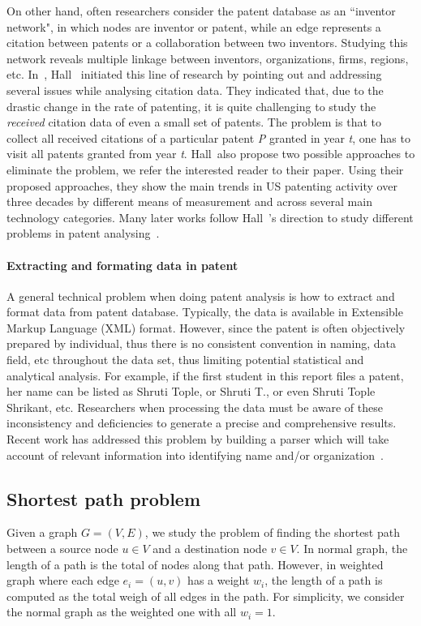 On other hand, often researchers consider the patent database as
an ``inventor network", in which nodes are inventor or patent, while an edge
represents a citation between patents or a collaboration between two inventors.
Studying this network reveals multiple linkage between inventors,
organizations, firms, regions, etc. In~\cite{Hall01thenber}, Hall~\etal
initiated this line of research by pointing out and addressing several issues
while analysing citation data. They indicated that, due to the drastic change
in the rate of patenting, it is quite challenging to study the {\em received}
citation data of even a small set of patents. The problem is that to collect
all received citations of a particular patent {\em P} granted in year {\em t},
one has to visit all patents granted from year {\em t}. Hall~\etal also propose
two possible approaches to eliminate the problem, we refer the interested
reader to their paper. Using their proposed approaches, they show the main
trends in US patenting activity over three decades by different means of
measurement and across several main technology categories. Many later works
follow Hall~\etal's direction to study different problems in patent
analysing~\cite{Leskovec:2005, Hall2000, leskovec2007graph, Acs2002}.

\paragraph{Extracting and formating data in patent} A general technical problem
when doing patent analysis is how to extract and format data from patent
database. Typically, the data is available in Extensible Markup Language (XML)
format. However, since the patent is often objectively prepared by individual,
thus there is no consistent convention in naming, data field, etc throughout
the data set, thus limiting potential statistical and analytical analysis. For example, if the first student in this report files a patent, her name can be listed as Shruti Tople, or Shruti T., or even Shruti Tople Shrikant, etc. Researchers when processing the data must be aware of these inconsistency and deficiencies to generate a precise and comprehensive results. Recent work has addressed this problem by building a parser which will take account of relevant information into identifying name and/or organization~\cite{formattingpatentdata, disambiguation, Torvik:2009}.
% 
\subsection{Shortest path problem}
Given a graph $G = (V, E)$, we study the problem of finding the shortest path between a source node $u \in V$ and a destination node $v \in V$. In normal graph, the length of a path is the total of nodes along that path. However, in weighted graph where each edge $e_i = (u, v)$ has a weight $w_i$, the length of a path is computed as the total weigh of all edges in the path. For simplicity, we consider the normal graph as the weighted one with all $w_i=1$.

